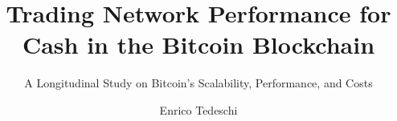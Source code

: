 \documentclass[USenglish]{uit-thesis}
\renewcommand{\bibname}{References}
\begin{document}
\renewcommand{\bibname}{References}

\title{Trading Network Performance for Cash in the Bitcoin Blockchain}
\subtitle{A Longitudinal Study on Bitcoin's Scalability, Performance, and Costs}	%
\author{Enrico Tedeschi}
\maketitle

\frontmatter


\end{document}
